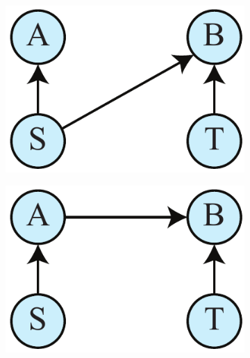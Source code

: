 \documentclass[12pt,onecolumn,nofootinbib]{revtex4-2}
\begin{document}
\begin{figure}[h]
        \begin{subfigure}[b]{0.18\textwidth}
                	\centering
        	\includegraphics[width=\textwidth]{bell-nft-1}
		\subcaption{}
		\label{nohva}
	\end{subfigure}
	\hspace{5em}
        \begin{subfigure}[b]{0.18\textwidth}
                	\centering
        	\includegraphics[width=\textwidth]{bell-nft-2}
             	\subcaption{}
	\label{nohvb}
        \end{subfigure}
        \hspace{5em}
                \begin{subfigure}[b]{0.18\textwidth}
                	\centering

\end{subfigure}
\end{figure}
\end{document}
